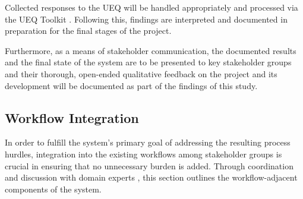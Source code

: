 \documentclass[11pt,a4paper,titlepage]{article}
\begin{document}
	Collected responses to the UEQ will be handled appropriately and processed via the UEQ Toolkit \cite{hinderks_user}. Following this, findings are interpreted and documented in preparation for the final stages of the project. 
	
	Furthermore, as a means of stakeholder communication, the documented results and the final state of the system are to be presented to key stakeholder groups and their thorough, open-ended qualitative feedback on the project and its development will be documented as part of the findings of this study. 


	\subsection{Workflow Integration}
	In order to fulfill the system's primary goal of addressing the resulting process hurdles, integration into the existing workflows among stakeholder groups is crucial in ensuring that no unnecessary burden is added. Through coordination and discussion with domain experts \cite{Rodriguez_A, Rodriguez_AG}, this section outlines the workflow-adjacent components of the system. 
\end{document}
